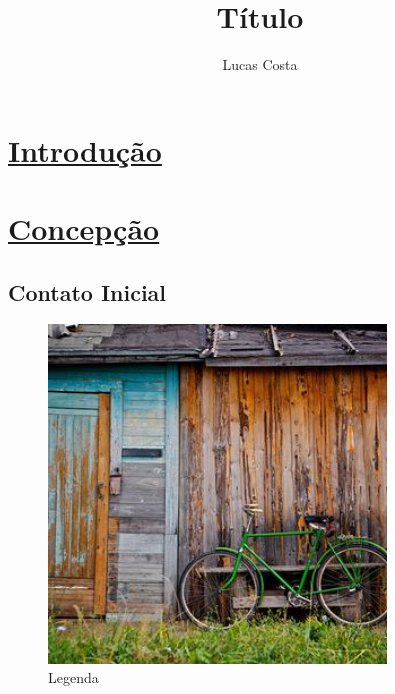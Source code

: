 \documentclass[a4paper, 12pt, oneside]{book}
\title{Título}
\author{Lucas Costa}
\begin{document}
\maketitle

\chapter*{\underline{Introdução}}

\lipsum

\noindent\makebox[\linewidth]{\rule{.5\paperwidth}{0.4pt}}

\lipsum

\chapter*{\underline{Concepção}}

\lipsum

\section*{Contato Inicial}

\lipsum


\begin{quote}
	\begin{flushright}
		\lipsum
	\end{flushright}
\end{quote}

\begin{figure}[H]
	\caption{Legenda}
	\centering
	\includegraphics[width=0.8\textwidth]{76-300x300.jpg} %
\end{figure}
\end{document}
